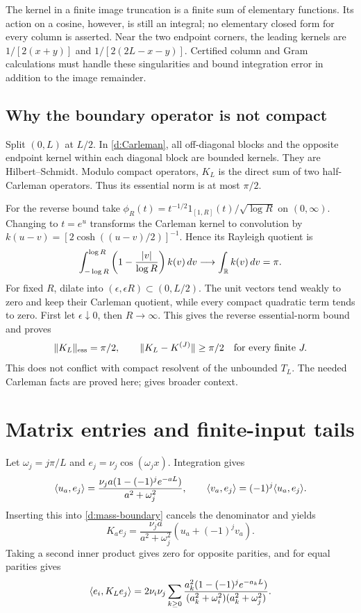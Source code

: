 The kernel in a finite image truncation is a finite sum of elementary
functions. Its action on a cosine, however, is still an integral; no
elementary closed form for every column is asserted. Near the two endpoint
corners, the leading kernels are $1/[2(x+y)]$ and $1/[2(2L-x-y)]$.
Certified column and Gram calculations must handle these singularities
and bound integration error in addition to the image remainder.

\subsection{Why the boundary operator is not compact}
Split $(0,L)$ at $L/2$. In \eqref{d:Carleman}, all off-diagonal blocks and
the opposite endpoint kernel within each diagonal block are bounded kernels.
They are Hilbert--Schmidt. Modulo compact operators, $K_L$ is the direct
sum of two half-Carleman operators. Thus its essential norm is at most
$\pi/2$.

For the reverse bound take
$\phi_R(t)=t^{-1/2}1_{[1,R]}(t)/\sqrt{\log R}$ on $(0,\infty)$.
Changing to $t=e^u$ transforms the Carleman kernel to convolution by
$k(u-v)=[2\cosh((u-v)/2)]^{-1}$. Hence its Rayleigh quotient is
\[
\int_{-\log R}^{\log R}
\left(1-\frac{|v|}{\log R}\right)k(v)\,dv\longrightarrow
\int_\mathbb R k(v)\,dv=\pi.
\]
For fixed $R$, dilate into $(\epsilon,\epsilon R)\subset(0,L/2)$.
The unit vectors tend weakly to zero and keep their Carleman quotient,
while every compact quadratic term tends to zero. First let
$\epsilon\downarrow0$, then $R\to\infty$. This gives the reverse
essential-norm bound and proves
\[
\lVert K_L\rVert_{\rm ess}=\pi/2,\qquad
\lVert K_L-K^{(J)}\rVert\ge\pi/2\quad\text{for every finite }J.
\]
This does not conflict with compact resolvent of the unbounded $T_L$.
The needed Carleman facts are proved here; \cite{Yafaev} gives broader context.

\section{Matrix entries and finite-input tails}
Let $\omega_j=j\pi/L$ and $e_j=\nu_j\cos(\omega_jx)$. Integration gives
\[
\langle u_a,e_j\rangle=\frac{\nu_ja(1-(-1)^je^{-aL})}{a^2+\omega_j^2},\qquad
\langle v_a,e_j\rangle=(-1)^j\langle u_a,e_j\rangle.
\]
Inserting this into \eqref{d:mass-boundary} cancels the denominator and yields
\begin{equation}\label{d:column}
K_ae_j=\frac{\nu_ja}{a^2+\omega_j^2}(u_a+(-1)^jv_a).
\end{equation}
Taking a second inner product gives zero for opposite parities, and for
equal parities gives
\begin{equation}\label{d:entries}
\langle e_i,K_Le_j\rangle=2\nu_i\nu_j\sum_{k\ge0}
\frac{a_k^2(1-(-1)^je^{-a_kL})}
{(a_k^2+\omega_i^2)(a_k^2+\omega_j^2)}.
\end{equation}
